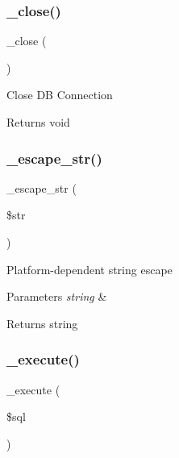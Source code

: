 \subsubsection{\texorpdfstring{\+\_\+close()}{\_close()}}
{\footnotesize\ttfamily \+\_\+close (\begin{DoxyParamCaption}{ }\end{DoxyParamCaption})\hspace{0.3cm}{\ttfamily [protected]}}

Close DB Connection

\begin{DoxyReturn}{Returns}
void 
\end{DoxyReturn}
\mbox{\label{class_c_i___d_b__mysql__driver_af8ef0237bfcdb19215b63fff769e7a55}} 
\subsubsection{\texorpdfstring{\+\_\+escape\+\_\+str()}{\_escape\_str()}}
{\footnotesize\ttfamily \+\_\+escape\+\_\+str (\begin{DoxyParamCaption}\item[{}]{\$str }\end{DoxyParamCaption})\hspace{0.3cm}{\ttfamily [protected]}}

Platform-\/dependent string escape


\begin{DoxyParams}{Parameters}
{\em string} & \\
\hline
\end{DoxyParams}
\begin{DoxyReturn}{Returns}
string 
\end{DoxyReturn}
\mbox{\label{class_c_i___d_b__mysql__driver_a114ab675d89bf8324a41785fb475e86d}} 
\subsubsection{\texorpdfstring{\+\_\+execute()}{\_execute()}}
{\footnotesize\ttfamily \+\_\+execute (\begin{DoxyParamCaption}\item[{}]{\$sql }\end{DoxyParamCaption})\hspace{0.3cm}{\ttfamily [protected]}}

